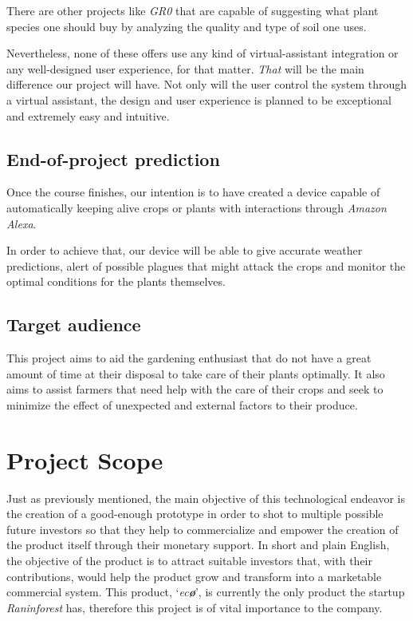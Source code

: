 \documentclass[english,runningheads,a4paper]{llncs}[2018/03/10]
\begin{document}
    There are other projects like \textit{GR0} that are capable of suggesting
    what plant species one should buy by analyzing the quality and type of soil
    one uses.

    Nevertheless, none of these offers use any kind of virtual-assistant
    integration or any well-designed user experience, for that matter.
    \textit{That} will be the main difference our project will have. Not only
    will the user control the system through a virtual assistant, the design and
    user experience is planned to be exceptional and extremely easy and
    intuitive.


    \subsection*{End-of-project prediction}

    Once the course finishes, our intention is to have created a device capable
    of automatically keeping alive crops or plants with interactions through
    \textit{Amazon Alexa}.

    In order to achieve that, our device will be able to give accurate weather
    predictions, alert of possible plagues that might attack the crops and
    monitor the optimal conditions for the plants themselves.


    \subsection*{Target audience}

    This project aims to aid the gardening enthusiast that do not have a great
    amount of time at their disposal to take care of their plants optimally. It
    also aims to assist farmers that need help with the care of their crops and
    seek to minimize the effect of unexpected and external factors to their
    produce.


\section*{Project Scope}

Just as previously mentioned, the main objective of this technological endeavor
is the creation of a good-enough prototype in order to shot to multiple possible
future investors so that they help to commercialize and empower the creation of
the product itself through their monetary support. In short and plain English,
the objective of the product is to attract suitable investors that, with their
contributions, would help the product grow and transform into a marketable
commercial system. This product, `\textit{ec\textbf{\o}}', is currently the
only product the startup \textit{Raninforest} has, therefore this project is of
vital importance to the company.
\end{document}
